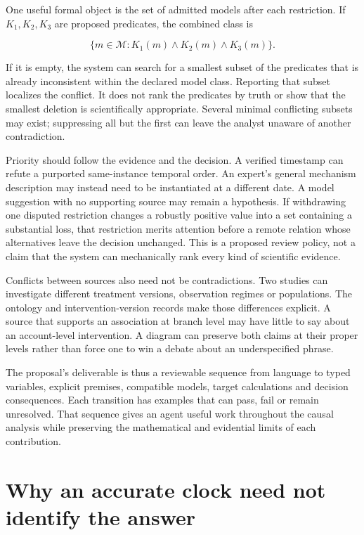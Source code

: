 One useful formal object is the set of admitted models after each
restriction. If \(K_1,K_2,K_3\) are proposed predicates, the combined
class is

\[
 \{m\in\mathcal M:K_1(m)\land K_2(m)\land K_3(m)\}.
\]

If it is empty, the system can search for a smallest subset of the
predicates that is already inconsistent within the declared model class.
Reporting that subset localizes the conflict. It does not rank the
predicates by truth or show that the smallest deletion is scientifically
appropriate. Several minimal conflicting subsets may exist; suppressing
all but the first can leave the analyst unaware of another
contradiction.

Priority should follow the evidence and the decision. A verified
timestamp can refute a purported same-instance temporal order. An
expert's general mechanism description may instead need to be
instantiated at a different date. A model suggestion with no supporting
source may remain a hypothesis. If withdrawing one disputed restriction
changes a robustly positive value into a set containing a substantial
loss, that restriction merits attention before a remote relation whose
alternatives leave the decision unchanged. This is a proposed review
policy, not a claim that the system can mechanically rank every kind of
scientific evidence.

Conflicts between sources also need not be contradictions. Two studies
can investigate different treatment versions, observation regimes or
populations. The ontology and intervention-version records make those
differences explicit. A source that supports an association at branch
level may have little to say about an account-level intervention. A
diagram can preserve both claims at their proper levels rather than
force one to win a debate about an underspecified phrase.

The proposal's deliverable is thus a reviewable sequence from language
to typed variables, explicit premises, compatible models, target
calculations and decision consequences. Each transition has examples
that can pass, fail or remain unresolved. That sequence gives an agent
useful work throughout the causal analysis while preserving the
mathematical and evidential limits of each contribution.
\label{exec13:ontology-development-end}


\hypertarget{why-an-accurate-clock-need-not-identify-the-answer}{%
\section{Why an accurate clock need not identify the
answer}\label{why-an-accurate-clock-need-not-identify-the-answer}}

